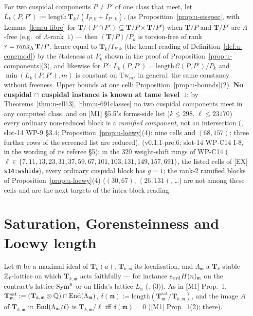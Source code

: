 \documentclass[11pt]{article}
\newcommand{\Iw}{\Lambda}                         %
\newcommand{\Tu}{\mathbf{T}}                      %
\newcommand{\Pk}[1]{P_{#1}}                       %
\newcommand{\Cg}{\mathcal{C}}                     %
\newcommand{\Zl}{\Z_\ell}
\begin{document}
\begin{prediction}\label{pr:u-U2}
For two cuspidal components $P\ne P'$ of one class that meet, let $L_k(P,P'):=\mathrm{length}\,\Tu_k/(I_{P,k}+I_{P',k})$. \PROVED{} (as
Proposition~\ref{prop:u-eisspec}, with Lemma~\ref{lem:u-fibre} for $\Tu/(P\cap P')\subseteq\Tu/P\times\Tu/P'$) when $\Tu/P$ and $\Tu/P'$ are $\Iw$-free (e.g.\ of
$\Iw$-rank~$1$) --- then $(\Tu/P)/\Pk{k}$ is torsion-free of rank $r=\rank_\Iw\Tu/P$, hence equal to $\Tu_k/I_{P,k}$ (the kernel reading of
Definition~\ref{def:u-congmod}) by the étaleness at $\Pk{k}$ shown in the proof of Proposition~\ref{prop:u-components}(3), and likewise for $P'$: $L_k(P,P')=\mathrm{length}\,\Cg(P,P')/\Pk{k}$ and $\min(L_k(P,P'),m)$ is constant on $\mathrm{Tw}_m$. \CONJ{} in general: the same constancy
without freeness. Upper bounds at one cell: Proposition~\ref{prop:u-bounds}(2). \textbf{No cuspidal $\cap$ cuspidal instance is known at tame level~$1$}: by
Theorems~\ref{thm:u-ell13}, \ref{thm:u-691classes} no two cuspidal components meet in any computed class, and on [M1] \S5.5's forms-side list
($k\le298$, $\ell\le23170$) every ordinary non-reduced block is a \emph{ramified component}, not an intersection (\COMP, slot-14 WP-9 \S3.4;
Proposition~\ref{prop:u-loewy}(4): nine cells and $(68,157)$; three further rows of the screened list are reduced).
\COMP{} (v0.1.1-pre.6; slot-14 WP-C14 I-8, in the wording of its referee 
\S5): in the $320$ weight-shift rungs of WP-C14 ($\ell\in\{7,11,13,23,31,37,59,67,101,103,131,149,157,691\}$, the listed cells of [EX]
\texttt{s14:wshida}), every ordinary cuspidal block has $g=1$; the rank-$2$ ramified blocks of
Proposition~\ref{prop:u-loewy}(4) ($(30,67)$, $(26,131)$, \dots) are not among these cells and are the next targets of the intra-block reading.
\end{prediction}

\section{Saturation, Gorensteinness and Loewy length}\label{sec:u-sat}

Let $\mathfrak m$ be a maximal ideal of $\Tu_k(a)$, $\Tu_{k,\mathfrak m}$ its localisation, and $\Lambda_{\mathfrak m}$ a $\Tu_{k}$-stable $\Zl$-lattice on which
$\Tu_{k,\mathfrak m}$ acts faithfully --- for instance $e_{\mathrm{ord}} H(n)_{\mathfrak m}$ on the contract's lattice $\mathrm{Sym}^{n}$ or on Hida's lattice $L_n$
(, (3)). As in [M1] Prop.~1, $\Tu^{\mathrm{sat}}_{\mathfrak m}:=(\Tu_{k,\mathfrak m}\otimes\Q)\cap\End(\Lambda_{\mathfrak m})$,
$\delta(\mathfrak m):=\mathrm{length}(\Tu^{\mathrm{sat}}_{\mathfrak m}/\Tu_{k,\mathfrak m})$, and the image $A$ of $\Tu_{k,\mathfrak m}$ in
$\mathrm{End}(\Lambda_{\mathfrak m}/\ell)$ is $\Tu_{k,\mathfrak m}/\ell$ iff $\delta(\mathfrak m)=0$ ([M1] Prop.~1(2); \PROVED{} there).
\end{document}
